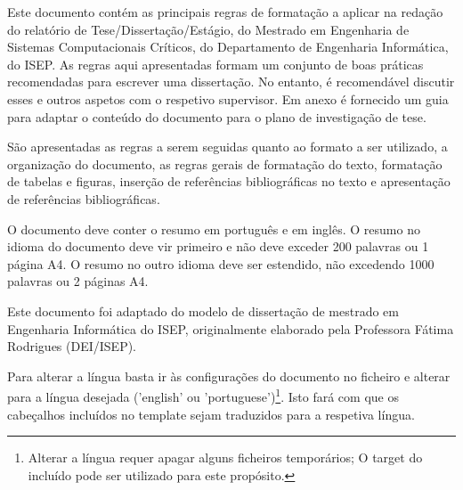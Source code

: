 \begin{abstractotherlanguage}

Este documento contém as principais regras de formatação a aplicar na redação do relatório de Tese/Dissertação/Estágio, do Mestrado em Engenharia de Sistemas Computacionais Críticos, do Departamento de Engenharia Informática, do ISEP. As regras aqui apresentadas formam um conjunto de boas práticas recomendadas para escrever uma dissertação. No entanto, é recomendável discutir esses e outros aspetos com o respetivo supervisor. Em anexo é fornecido um guia para adaptar o conteúdo do documento para o plano de investigação de tese.

São apresentadas as regras a serem seguidas quanto ao formato a ser utilizado, a organização do documento, as regras gerais de formatação do texto, formatação de tabelas e figuras, inserção de referências bibliográficas no texto e apresentação de referências bibliográficas.

O documento deve conter o resumo em português e em inglês. O resumo no idioma do documento deve vir primeiro e não deve exceder 200 palavras ou 1 página A4. O resumo no outro idioma deve ser estendido, não excedendo 1000 palavras ou 2 páginas A4.

Este documento foi adaptado do modelo de dissertação de mestrado em Engenharia Informática do ISEP, originalmente elaborado pela Professora Fátima Rodrigues (DEI/ISEP).

Para alterar a língua basta ir às configurações do documento no ficheiro  e alterar para a língua desejada ('english' ou 'portuguese')\footnote{Alterar a língua requer apagar alguns ficheiros temporários; O target  do  incluído pode ser utilizado para este propósito.}. Isto fará com que os cabeçalhos incluídos no template sejam traduzidos para a respetiva língua.

\end{abstractotherlanguage}



\tableofcontents %

\listoffigures %

